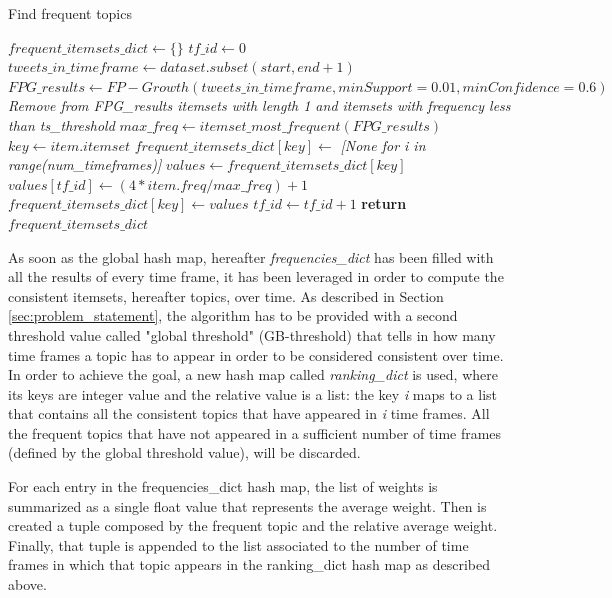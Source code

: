 \begin{algorithm*}
	\caption{Find frequent topics}
	\label{find_frequent_topics_algorithm}
	\begin{algorithmic}[1]
		\State $frequent\_itemsets\_dict\gets \{\}$
		\State $tf\_id\gets 0$
			\State $tweets\_in\_timeframe\gets dataset.subset(start, end + 1)$
			\State $FPG\_results\gets FP-Growth(tweets\_in\_timeframe, minSupport=0.01, minConfidence=0.6)$
			\State \textit{Remove from FPG\_results itemsets with length 1 and itemsets with frequency less than ts\_threshold}
			\State $max\_freq\gets itemset\_most\_frequent(FPG\_results)$
				\State $key\gets item.itemset$
					\State $frequent\_itemsets\_dict[key]\gets $ \textit{[None for i in range(num\_timeframes)]}
				\EndIf
				\State $values\gets frequent\_itemsets\_dict[key]$
				\State $values[tf\_id]\gets (4 * item.freq / max\_freq) + 1$
				\State $frequent\_itemsets\_dict[key]\gets values$
			\EndFor
			\State $tf\_id\gets tf\_id + 1$
		\EndFor
		\State \textbf{return} $frequent\_itemsets\_dict$
		\EndFunction
	\end{algorithmic}
\end{algorithm*}

As soon as the global hash map, hereafter \textit{frequencies\_dict} has been filled with all the results of every time frame, it has been leveraged in order to compute the consistent itemsets, hereafter topics, over time. As described in Section \ref{sec:problem_statement}, the algorithm has to be provided with a second threshold value called "global threshold" (GB-threshold) that tells in how many time frames a topic has to appear in order to be considered consistent over time. In order to achieve the goal, a new hash map called \textit{ranking\_dict} is used, where its keys are integer value and the relative value is a list: the key \textit{i} maps to a list that contains all the consistent topics that have appeared in \textit{i} time frames. All the frequent topics that have not appeared in a sufficient number of time frames (defined by the global threshold value), will be discarded. 

\noindent For each entry in the frequencies\_dict hash map, the list of weights is summarized as a single float value that represents the average weight. Then is created a tuple composed by the frequent topic and the relative average weight. Finally, that tuple is appended to the list associated to the number of time frames in which that topic appears in the ranking\_dict hash map as described above. 

